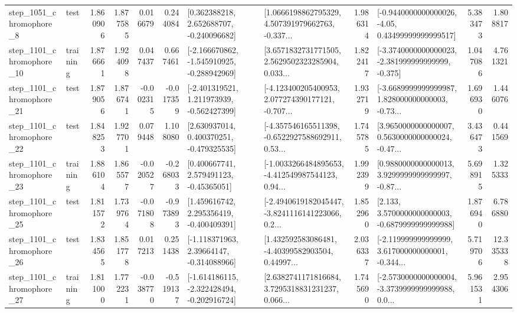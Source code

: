 \begin{tabular}{llrrrrllrlrr}
  step\_1051\_chromophore\_8 &      test &      1.860906 &    1.877585 &      0.016679 &  0.244084 &    [0.362388218, 2.652688707, -0.240096682] &  [1.0666198862795329, 4.507391979662763, -0.337... &       1.986314 &  [-0.9440000000000026, -4.05, 0.43499999999999517] &            5.383473 &          1.808817 \\
 step\_1101\_chromophore\_10 &  training &      1.876661 &    1.924098 &      0.047437 &  0.667461 &  [-2.166670862, -1.545910925, -0.288942969] &  [3.6571832731771505, 2.5629502323285904, 0.033... &       1.822417 &  [-3.3740000000000023, -2.381999999999999, -0.375] &            1.047086 &          4.761321 \\
 step\_1101\_chromophore\_21 &      test &      1.879056 &    1.876741 &     -0.002315 & -0.017359 &   [-2.401319521, 1.211973939, -0.562427399] &  [-4.123400205400953, 2.077274390177121, -0.707... &       1.932719 &  [-3.6689999999999987, 1.828000000000003, -0.73... &            1.696930 &          1.446076 \\
 step\_1101\_chromophore\_22 &      test &      1.848253 &    1.927701 &      0.079448 &  1.108080 &    [2.630937014, 0.400370251, -0.479325535] &  [-4.357546165511398, -0.6522927588692911, 0.53... &       1.745785 &  [3.9650000000000007, 0.5630000000000024, -0.47... &            3.436473 &          0.441569 \\
 step\_1101\_chromophore\_23 &  training &      1.886104 &    1.865577 &     -0.020527 & -0.268033 &     [0.400667741, 2.579491123, -0.45365051] &  [-1.0033266484895653, -4.412549987544123, 0.94... &       1.992399 &  [0.9880000000000013, 3.9299999999999997, -0.87... &            5.698915 &          1.325333 \\
 step\_1101\_chromophore\_25 &      test &      1.811572 &    1.739764 &     -0.071808 & -0.973893 &    [1.459616742, 2.295356419, -0.400409391] &  [-2.4940619182045447, -3.8241116141223066, 0.2... &       1.852960 &   [2.133, 3.5700000000000003, -0.6879999999999988] &            1.876940 &          6.786880 \\
 step\_1101\_chromophore\_26 &      test &      1.834565 &    1.851778 &      0.017213 &  0.251438 &    [-1.118371963, 2.39664147, -0.314088966] &  [1.432592583086481, -4.40399582903504, 0.44997... &       2.036337 &  [-2.119999999999999, 3.617000000000001, -0.344... &            5.719706 &         12.335338 \\
 step\_1101\_chromophore\_27 &  training &      1.811000 &    1.772231 &     -0.038770 & -0.519137 &  [-1.614186115, -2.322428494, -0.202916724] &  [2.6382741171816684, 3.7295318831231237, 0.066... &       1.745690 &  [-2.5730000000000004, -3.3739999999999988, 0.0... &            5.961531 &          2.954306 \\

\end{tabular}
